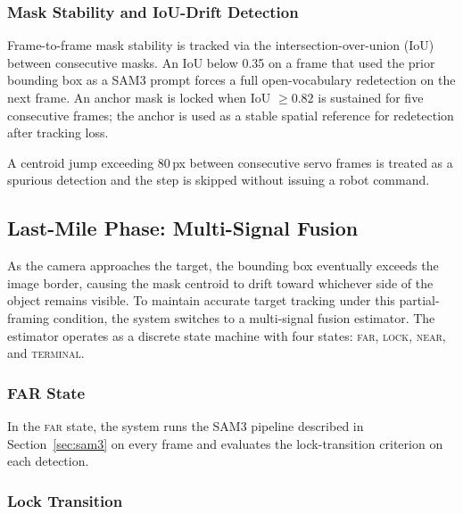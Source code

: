 \documentclass[lettersize,journal]{IEEEtran}
\begin{document}
\subsubsection{Mask Stability and IoU-Drift Detection}
\label{sec:tracker}

Frame-to-frame mask stability is tracked via the intersection-over-union (IoU)
between consecutive masks. An IoU below 0.35 on a frame that used the
prior bounding box as a SAM3 prompt forces a full open-vocabulary redetection
on the next frame. An anchor mask is locked when IoU $\geq 0.82$ is sustained
for five consecutive frames; the anchor is used as a stable spatial reference
for redetection after tracking loss.

A centroid jump exceeding 80\,px between consecutive servo frames is treated
as a spurious detection and the step is skipped without issuing a robot command.

\subsection{Last-Mile Phase: Multi-Signal Fusion}
\label{sec:lastmile}

As the camera approaches the target, the bounding box eventually exceeds the
image border, causing the mask centroid to drift toward whichever side of the
object remains visible. To maintain accurate target tracking under this
partial-framing condition, the system switches to a multi-signal fusion
estimator. The estimator operates as a discrete state machine with four
states: \textsc{far}, \textsc{lock}, \textsc{near}, and \textsc{terminal}.

\subsubsection{FAR State}

In the \textsc{far} state, the system runs the SAM3 pipeline described
in Section~\ref{sec:sam3} on every frame and evaluates the lock-transition
criterion on each detection.

\subsubsection{Lock Transition}
\end{document}
